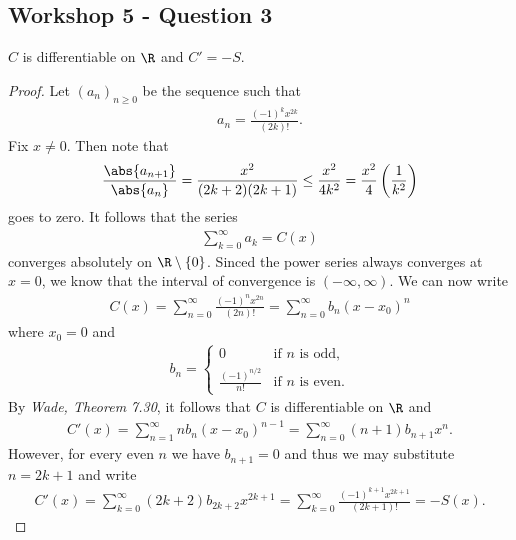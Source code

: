 \documentclass{article}
\begin{document}
\subsection*{Workshop 5 - Question 3}


\begin{claim*}
   $C$ is differentiable on $\R$ and $C'=-S$.
\end{claim*}
\begin{proof}
   Let $(a_n)_{n\geq 0}$ be the sequence such that
   \begin{align*}
      a_n = \frac{(-1)^{k}x^{2k}}{(2k)!}.
   \end{align*}
   Fix $x\not=0$. Then note that
   \begin{align*}
      \frac{\abs{a_{n+1}}}{\abs{a_n}} = \frac{x^2}{(2k+2)(2k+1)} \leq \frac{x^2}{4k^2} = \frac{x^2}{4}\left(\frac{1}{k^2}\right)
   \end{align*}
   goes to zero. It follows that the series
   \begin{align*}
      \sum_{k=0}^\infty a_k = C(x)
   \end{align*}
   converges absolutely on $\R\setminus\{0\}$.
   Sinced the power series always converges at $x=0$, we know that the interval of convergence is $(-\infty,\infty)$.
   We can now write
   \begin{align*}
      C(x) = \sum_{n=0}^\infty \frac{(-1)^{n}x^{2n}}{(2n)!} = \sum_{n=0}^\infty b_n(x-x_0)^n
   \end{align*}
   where $x_0=0$ and
   \begin{align*}
      b_n = \begin{cases}
         0                     & \text{if $n$ is odd},  \\
         \frac{(-1)^{n/2}}{n!} & \text{if $n$ is even}.
      \end{cases}
   \end{align*}
   By \emph{Wade, Theorem 7.30}, it follows that $C$ is differentiable on $\R$ and
   \begin{align*}
      C'(x) = \sum_{n=1}^\infty nb_n(x-x_0)^{n-1} = \sum_{n=0}^\infty (n+1)b_{n+1}x^n.
   \end{align*}
   However, for every even $n$ we have $b_{n+1}=0$ and thus we may substitute $n=2k+1$ and write
   \begin{align*}
      C'(x) = \sum_{k=0}^\infty (2k+2)b_{2k+2}x^{2k+1}
      = \sum_{k=0}^\infty \frac{(-1)^{k+1}x^{2k+1}}{(2k+1)!}
      = -S(x).
   \end{align*}
\end{proof}
\end{document}

